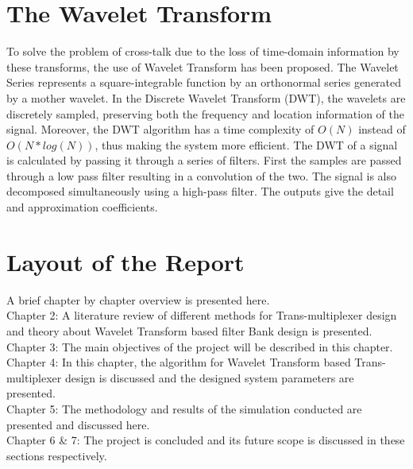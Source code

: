 \section{The Wavelet Transform}
To solve the problem of cross-talk due to the loss of time-domain information by these transforms, the use of Wavelet Transform has been proposed. The Wavelet Series represents a square-integrable function by an orthonormal series generated by a mother wavelet. In the Discrete Wavelet Transform (DWT), the wavelets are discretely sampled, preserving both the frequency and location information of the signal. Moreover, the DWT algorithm has a time complexity of $O(N)$ instead of $O(N*log(N))$, thus making the system more efficient. The DWT of a signal is calculated by passing it through a series of filters. First the samples are passed through a low pass filter resulting in a convolution of the two. The signal is also decomposed simultaneously using a high-pass filter. The outputs give the detail and approximation coefficients.



\section{Layout of the Report} A brief chapter by chapter overview is presented here.\\
Chapter 2: A literature review of different methods for Trans-multiplexer design and theory about Wavelet Transform based filter Bank design is presented.  \\
Chapter 3: The main objectives of the project will be described in this chapter.\\
Chapter 4: In this chapter, the algorithm for Wavelet Transform based Trans-multiplexer design is discussed and the designed system parameters are presented.  \\
Chapter 5: The methodology and results of the simulation conducted are presented and discussed here. \\
Chapter 6 \& 7: The project is concluded and its future scope is discussed in these sections respectively.
